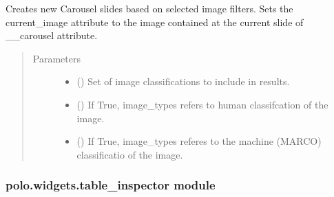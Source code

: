 \documentclass[letterpaper,10pt,english]{sphinxmanual}
\begin{document}
\begin{fulllineitems}

\begin{fulllineitems}
\label{\detokenize{polo.widgets:polo.widgets.slideshow_viewer.SlideshowViewer.update_slides_from_filters}}
Creates new Carousel slides based on selected image filters.
Sets the current\_image attribute to the image contained at
the current slide of \_\_carousel attribute.
\begin{quote}\begin{description}
\item[{Parameters}] \leavevmode\begin{itemize}
\item {} 
 () \textendash{} Set of image classifications to include in results.

\item {} 
 () \textendash{} If True, image\_types refers to human classifcation of the image.

\item {} 
 () \textendash{} If True, image\_types referes to the machine (MARCO) classificatio            of the image.

\end{itemize}

\end{description}\end{quote}

\end{fulllineitems}


\end{fulllineitems}



\subsubsection{polo.widgets.table\_inspector module}
\label{\detokenize{polo.widgets:module-polo.widgets.table_inspector}}\label{\detokenize{polo.widgets:polo-widgets-table-inspector-module}}
\end{document}
